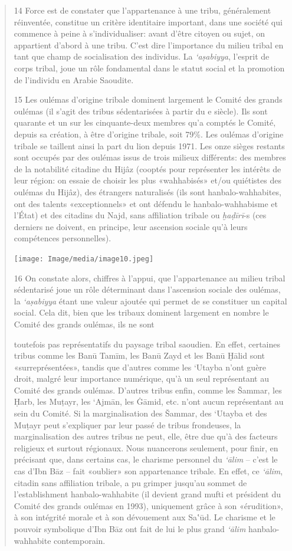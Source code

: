 \begin{quote}
14 Force est de constater que l'appartenance à une tribu, généralement
réinventée, constitue un critère identitaire important, dans une société
qui commence à peine à s'individualiser: avant d'être citoyen ou sujet,
on appartient d'abord à une tribu. C'est dire l'importance du milieu
tribal en tant que champ de socialisation des individus. La
\emph{`aṣabiyya}, l'esprit de corps tribal, joue un rôle fondamental
dans le statut social et la promotion de l'individu en Arabie Saoudite.

15 Les oulémas d'origine tribale dominent largement le Comité des grands
oulémas (il s'agit des tribus sédentarisées à partir du e siècle). Ils
sont quarante et un sur les cinquante-deux membres qu'a comptés le
Comité, depuis sa création, à être d'origine tribale, soit 79\%. Les
oulémas d'origine tribale se taillent ainsi la part du lion depuis 1971.
Les onze sièges restants sont occupés par des oulémas issus de trois
milieux différents: des membres de la notabilité citadine du Hijâz
(cooptés pour représenter les intérêts de leur région: on essaie de
choisir les plus «wahhabisés» et/ou quiétistes des oulémas du Hijâz),
des étrangers naturalisés (ils sont hanbalo-wahhabites, ont des talents
«exceptionnels» et ont défendu le hanbalo-wahhabisme et l'État) et des
citadins du Najd, sans affiliation tribale ou \emph{ḫaḍīrī}-s (ces
derniers ne doivent, en principe, leur ascension sociale qu'à leurs
compétences personnelles).

\texttt{[image: Image/media/image10.jpeg]}

16 On constate alors, chiffres à l'appui, que l'appartenance au milieu
tribal sédentarisé joue un rôle déterminant dans l'ascension sociale des
oulémas, la \emph{`aṣabiyya} étant une valeur ajoutée qui permet de se
constituer un capital social. Cela dit, bien que les tribaux dominent
largement en nombre le Comité des grands oulémas, ils ne sont

toutefois pas représentatifs du paysage tribal saoudien. En effet,
certaines tribus comme les Banū Tamīm, les Banū Zayd et les Banū Ḫālid
sont «surreprésentées», tandis que d'autres comme les `Utayba n'ont
guère droit, malgré leur importance numérique, qu'à un seul représentant
au Comité des grands oulémas. D'autres tribus enfin, comme les Šammar,
les Ḥarb, les Muṭayr, les `Ajmān, les Ġāmid, etc. n'ont aucun
représentant au sein du Comité. Si la marginalisation des Šammar, des
`Utayba et des Muṭayr peut s'expliquer par leur passé de tribus
frondeuses, la marginalisation des autres tribus ne peut, elle, être due
qu'à des facteurs religieux et surtout régionaux. Nous nuancerons
seulement, pour finir, en précisant que, dans certains cas, le charisme
personnel du \emph{`ālim} -- c'est le cas d'Ibn Bāz -- fait «oublier»
son appartenance tribale. En effet, ce \emph{`ālim}, citadin sans
affiliation tribale, a pu grimper jusqu'au sommet de l'establishment
hanbalo-wahhabite (il devient grand mufti et président du Comité des
grands oulémas en 1993), uniquement grâce à son «érudition», à son
intégrité morale et à son dévouement aux Sa‛ūd. Le charisme et le
pouvoir symbolique d'Ibn Bāz ont fait de lui le plus grand \emph{`ālim}
hanbalo-wahhabite contemporain.


\end{quote}
